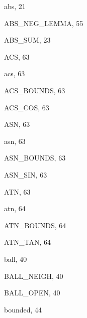 \begin{theindex}

  \item {\ptt abs}, 21
  \item {\ptt ABS\_NEG\_LEMMA}, 55
  \item {\ptt ABS\_SUM}, 23
  \item {\ptt ACS}, 63
  \item {\ptt acs}, 63
  \item {\ptt ACS\_BOUNDS}, 63
  \item {\ptt ACS\_COS}, 63
  \item {\ptt ASN}, 63
  \item {\ptt asn}, 63
  \item {\ptt ASN\_BOUNDS}, 63
  \item {\ptt ASN\_SIN}, 63
  \item {\ptt ATN}, 63
  \item {\ptt atn}, 64
  \item {\ptt ATN\_BOUNDS}, 64
  \item {\ptt ATN\_TAN}, 64

  \indexspace

  \item {\ptt ball}, 40
  \item {\ptt BALL\_NEIGH}, 40
  \item {\ptt BALL\_OPEN}, 40
  \item {\ptt bounded}, 44

  \indexspace


\end{theindex}
